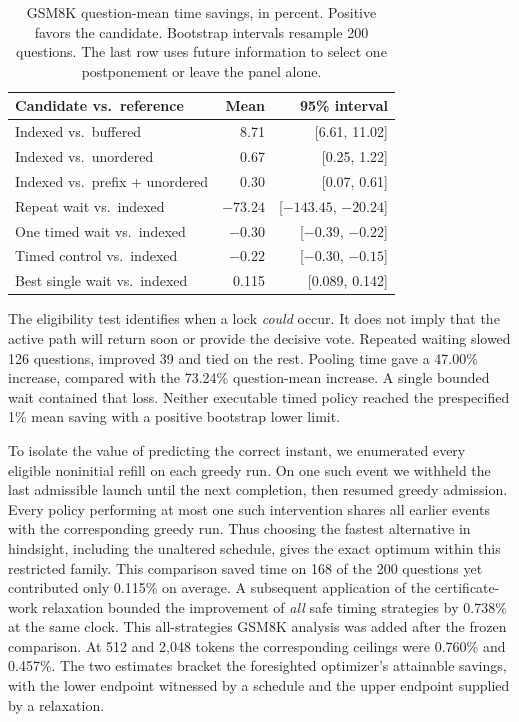\begin{table}[tb]\centering
\caption{GSM8K question-mean time savings, in percent. Positive favors the candidate. Bootstrap intervals resample 200 questions. The last row uses future information to select one postponement or leave the panel alone.}\label{tab:gsm}
\small\setlength{\tabcolsep}{3pt}
\begin{tabular}{lrr}\toprule
Candidate vs.\ reference & Mean & 95\% interval\\\midrule
Indexed vs.\ buffered & 8.71 & [6.61, 11.02]\\
Indexed vs.\ unordered & 0.67 & [0.25, 1.22]\\
Indexed vs.\ prefix + unordered & 0.30 & [0.07, 0.61]\\
Repeat wait vs.\ indexed & $-73.24$ & [$-143.45$, $-20.24$]\\
One timed wait vs.\ indexed & $-0.30$ & [$-0.39$, $-0.22$]\\
Timed control vs.\ indexed & $-0.22$ & [$-0.30$, $-0.15$]\\
Best single wait vs.\ indexed & 0.115 & [0.089, 0.142]\\\bottomrule
\end{tabular}
\end{table}
The eligibility test identifies when a lock \emph{could} occur. It does not imply that the active path will return soon or provide the decisive vote. Repeated waiting slowed 126 questions, improved 39 and tied on the rest. Pooling time gave a 47.00\% increase, compared with the 73.24\% question-mean increase. A single bounded wait contained that loss. Neither executable timed policy reached the prespecified 1\% mean saving with a positive bootstrap lower limit.

To isolate the value of predicting the correct instant, we enumerated every eligible noninitial refill on each greedy run. On one such event we withheld the last admissible launch until the next completion, then resumed greedy admission. Every policy performing at most one such intervention shares all earlier events with the corresponding greedy run. Thus choosing the fastest alternative in hindsight, including the unaltered schedule, gives the exact optimum within this restricted family. This comparison saved time on 168 of the 200 questions yet contributed only 0.115\% on average. A subsequent application of the certificate-work relaxation bounded the improvement of \emph{all} safe timing strategies by 0.738\% at the same clock. This all-strategies GSM8K analysis was added after the frozen comparison. At 512 and 2,048 tokens the corresponding ceilings were 0.760\% and 0.457\%. The two estimates bracket the foresighted optimizer's attainable savings, with the lower endpoint witnessed by a schedule and the upper endpoint supplied by a relaxation.

